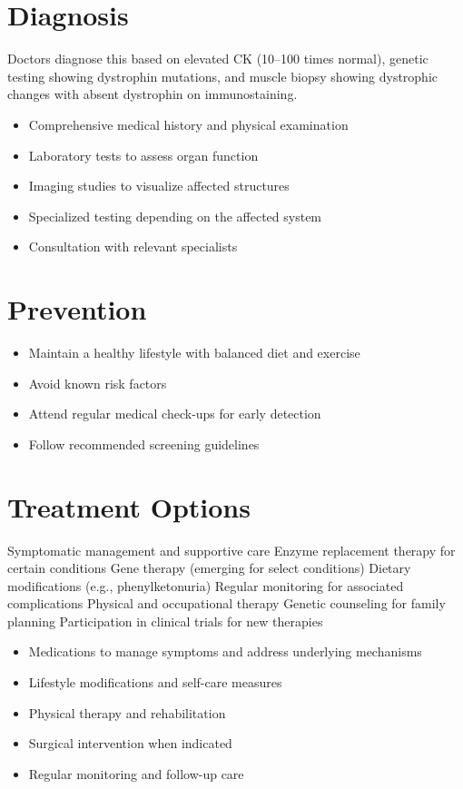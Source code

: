 \section{Diagnosis}
Doctors diagnose this based on elevated CK (10--100 times normal), genetic testing showing dystrophin mutations, and muscle biopsy showing dystrophic changes with absent dystrophin on immunostaining.

\begin{itemize}[noitemsep]
  \item Comprehensive medical history and physical examination
  \item Laboratory tests to assess organ function
  \item Imaging studies to visualize affected structures
  \item Specialized testing depending on the affected system
  \item Consultation with relevant specialists
\end{itemize}
\section{Prevention}
\begin{itemize}[noitemsep]
  \item Maintain a healthy lifestyle with balanced diet and exercise
  \item Avoid known risk factors
  \item Attend regular medical check-ups for early detection
  \item Follow recommended screening guidelines
\end{itemize}
\section{Treatment Options}
Symptomatic management and supportive care Enzyme replacement therapy for certain conditions Gene therapy (emerging for select conditions) Dietary modifications (e.g., phenylketonuria) Regular monitoring for associated complications Physical and occupational therapy Genetic counseling for family planning Participation in clinical trials for new therapies

\begin{itemize}[noitemsep]
  \item Medications to manage symptoms and address underlying mechanisms
  \item Lifestyle modifications and self-care measures
  \item Physical therapy and rehabilitation
  \item Surgical intervention when indicated
  \item Regular monitoring and follow-up care
\end{itemize}

